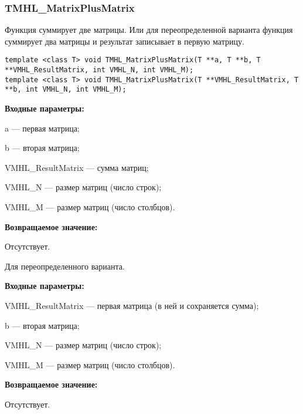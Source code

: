 \documentclass[a4paper,12pt]{article}
\begin{document}
\subsubsection{TMHL\_MatrixPlusMatrix}\label{TMHL_MatrixPlusMatrix}

Функция суммирует две матрицы. Или для переопределенной варианта функция суммирует два матрицы и результат записывает в первую матрицу. 


\begin{lstlisting}[label=code_syntax_TMHL_MatrixPlusMatrix,caption=Синтаксис]
template <class T> void TMHL_MatrixPlusMatrix(T **a, T **b, T **VMHL_ResultMatrix, int VMHL_N, int VMHL_M);
template <class T> void TMHL_MatrixPlusMatrix(T **VMHL_ResultMatrix, T **b, int VMHL_N, int VMHL_M);
\end{lstlisting}

\textbf{Входные параметры:}

 a --- первая матрица;
 
 b --- вторая матрица;
 
 VMHL\_ResultMatrix --- сумма матриц;
 
 VMHL\_N --- размер матриц (число строк);
 
 VMHL\_M --- размер матриц (число столбцов).

\textbf{Возвращаемое значение:}

Отсутствует.

Для переопределенного варианта.

\textbf{Входные параметры:}

 VMHL\_ResultMatrix --- первая матрица (в ней и сохраняется сумма);
 
 b --- вторая матрица;
 
 VMHL\_N --- размер матриц (число строк);
 
 VMHL\_M --- размер матриц (число столбцов).
 
 \textbf{Возвращаемое значение:}

Отсутствует.
\end{document}
